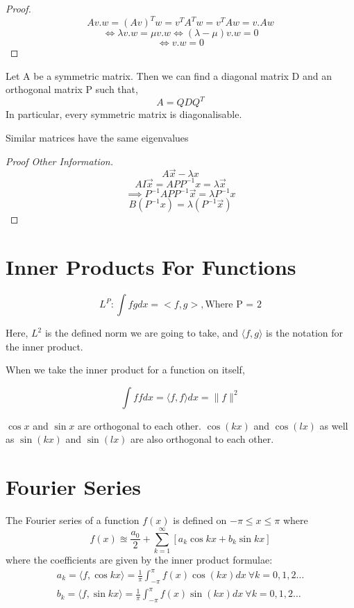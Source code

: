 \documentclass{report}
\begin{document}
\begin{proof}
	\[
		Av .  w = (Av)^T w = v^T A^Tw = v^T Aw = v . Aw
	\]
	\[
	\iff \lambda v . w = \mu v . w \iff (\lambda - \mu) v.w = 0
	\]
	\[
		\iff v . w  = 0
	\]
\end{proof}
\begin{theorem}
   Let A be a symmetric matrix. Then we can find a diagonal matrix D and an orthogonal matrix P such that,
\[
   A = QDQ^T
\]	
In particular, every symmetric matrix is diagonalisable.
\end{theorem}
\begin{lemma}
	Similar matrices have the same eigenvalues
\end{lemma}
\begin{proof}[Proof Other Information]
   \[
   A\vec{x} - \lambda{x}	
   \]
   \[
      AI\vec{x} = APP^{-1}x = \lambda \vec{x}
   \]
   \[
      \implies P^{-1} A P P^{-1} \vec{x} = \lambda P^{-1} x
   \]
   \[
   	B(P^{-1}x) = \lambda(P^{-1}\vec{x})
   \]
   
\end{proof}

\section{Inner Products For Functions} %
\[L^P: \int f g dx = <f,g>, \text{Where P = 2}\]

Here, $L^2$ is the defined norm we are going to take, and $\langle f,g\rangle$ is the notation for the inner product.

When we take the inner product for a function on itself,

\[\int f f dx = \langle f,f\rangle dx = \|f\|^2\]

\begin{note}
   $\cos{x}$ and $\sin{x}$ are orthogonal to each other. $\cos{(kx)}$ and $\cos{(lx)}$ as well as $\sin{(kx)}$ and $\sin{(lx)}$ are also orthogonal to each other.
\end{note}



\section{Fourier Series}
\begin{definition}
   The Fourier series of a function $f(x)$ is defined on $-\pi \leq x \leq \pi$ where    \[
   	 f(x) \approxeq \frac{a_0}{2}+\sum_{k=1}^{\infty}[a_k \cos{kx} + b_k \sin{kx}]
   \]
   where the coefficients are given by the inner product formulae:
   \begin{align*}
      a_k = \langle f, \cos{kx} \rangle = \frac{1}{\pi}\int_{-\pi}^{\pi} f(x) \cos{(kx)} dx \ \forall k = 0,1,2\dots \\
      b_k = \langle f, \sin{kx} \rangle = \frac{1}{\pi}\int_{-\pi}^{\pi} f(x) \sin{(kx)} dx \ \forall k = 0,1,2\dots
   \end{align*}
\end{definition}
\end{document}
